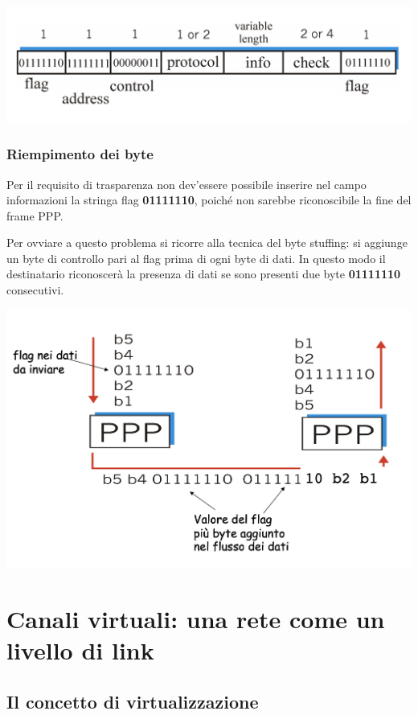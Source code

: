 \documentclass{report}
\begin{document}
\begin{center}
		\includegraphics[width=0.7\linewidth]{ppp}
	\end{center}

\hypertarget{header-n268}{%
\subsubsection{Riempimento dei byte}\label{header-n268}}

Per il requisito di trasparenza non dev'essere possibile inserire nel
campo informazioni la stringa flag \textbf{01111110}, poiché non sarebbe
riconoscibile la fine del frame PPP.

Per ovviare a questo problema si ricorre alla tecnica del byte stuffing:
si aggiunge un byte di controllo pari al flag prima di ogni byte di
dati. In questo modo il destinatario riconoscerà la presenza di dati se
sono presenti due byte \textbf{01111110} consecutivi.

\begin{center}
		\includegraphics[width=0.7\linewidth]{byte-stuffing}
	\end{center}

\hypertarget{header-n272}{%
\section{Canali virtuali: una rete come un livello di
link}\label{header-n272}}

\hypertarget{header-n273}{%
\subsection{Il concetto di virtualizzazione}\label{header-n273}}
\end{document}

